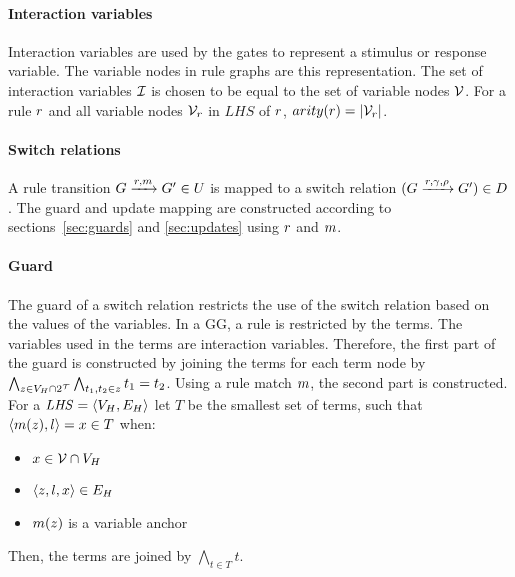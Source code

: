 \paragraph*{Interaction variables}
Interaction variables are used by the gates to represent a stimulus or response variable. The variable nodes in rule graphs are this representation. The set of interaction variables $\mathcal{I}$ is chosen to be equal to the set of variable nodes $\mathcal{V}$. For a rule $r$ and all variable nodes $\mathcal{V}_r$ in $\mathit{LHS}$ of $r$, $arity(r) = |\mathcal{V}_r|$. 

\paragraph*{Switch relations}
A rule transition $G \xrightarrow{r, m} G' \in U$ is mapped to a switch relation $(G\xrightarrow{r, \gamma, \rho}G') \in D$. The guard and update mapping are constructed according to sections~\ref{sec:guards} and \ref{sec:updates} using $r$ and $m$. 

\paragraph*{Guard}\label{sec:guards}
The guard of a switch relation restricts the use of the switch relation based on the values of the variables. In a GG, a rule is restricted by the terms. The variables used in the terms are interaction variables. Therefore, the first part of the guard is constructed by joining the terms for each term node by $\bigwedge_{z \in V_{H} \cap 2^{\mathcal{T}}}\bigwedge_{t_1, t_2 \in z}t_1 = t_2$. Using a rule match $m$, the second part is constructed. For a $\mathit{LHS} = \langle V_{H}, E_{H}\rangle$ let $T$ be the smallest set of terms, such that $\langle m(z), l \rangle = x \in T$ when:
\begin{itemize}
\item $x \in \mathcal{V} \cap V_{H}$
\item $\langle z, l, x\rangle \in E_{H}$
\item $m(z)$ is a variable anchor
\end{itemize}
Then, the terms are joined by $\bigwedge_{t\in T}t$.

